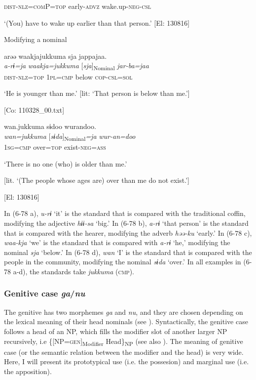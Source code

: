       \textsc{dist}-\textsc{nlz}=\textsc{com}P=\textsc{top}  early-\textsc{advz}  wake.up-\textsc{neg}-\textsc{csl}

\glt ‘(You) have to wake up earlier than that person.’ [El: 130816]

  Modifying a nominal

 \ex {\TM}  arəə  waakjajukkuma  sja  jappajaa.\\
\gll \textit{a-rɨ=ja}  \textit{waakja=jukkuma}  [\textit{sja}]\textsubscript{Nominal}  \textit{jar-ba=jaa}\\

      \textsc{dist}-\textsc{nlz}=\textsc{top}  1\textsc{pl}=\textsc{cmp}  below  \textsc{cop}-\textsc{csl}=\textsc{sol}

\glt ‘He is younger than me.’ [lit: ‘That person is below than me.’]

      [Co: 110328\_00.txt]
\z

 \ex {\TM}  wan.jukkuma  sɨdoo  wurandoo.\\
\gll \textit{wan=jukkuma}  [\textit{sɨda}]\textsubscript{Nominal}\textit{=ja}  \textit{wur-an=doo}\\

      1\textsc{sg}=\textsc{cmp}  over=\textsc{top}  exist-\textsc{neg}=\textsc{ass}

\glt ‘There is no one (who) is older than me.’

[lit. ‘(The people whose ages are) over than me do not exist.’]

      [El: 130816]

In (6-78 a), \textit{u-rɨ} ‘it’ is the standard that is compared with the traditional coffin, modifying the adjective \textit{hɨɨ-sa} ‘big.’ In (6-78 b), \textit{a-rɨ} ‘that person’ is the standard that is compared with the hearer, modifying the adverb \textit{həə-ku} ‘early.’ In (6-78 c), \textit{waa-kja} ‘we’ is the standard that is compared with \textit{a-rɨ} ‘he,’ modifying the nominal \textit{sja} ‘below.’ In (6-78 d), \textit{wan} ‘I’ is the standard that is compared with the people in the community, modifying the nominal \textit{sɨda} ‘over.’ In all examples in (6-78 a-d), the standards take \textit{jukkuma} (\textsc{cmp}).

\subsubsection{ Genitive case \textit{ga}/\textit{nu}}

The genitive has two morphemes \textit{ga} and \textit{nu}, and they are chosen depending on the lexical meaning of their head nominals (see ). Syntactically, the genitive case follows a head of an NP, which fills the modifier slot of another larger NP recursively, i.e \{[NP=\textsc{gen}]\textsubscript{Modifier} Head\}\textsubscript{NP} (see also ). The meaning of genitive case (or the semantic relation between the modifier and the head) is very wide. Here, I will present its prototypical use (i.e. the possesion) and marginal use (i.e. the apposition).

